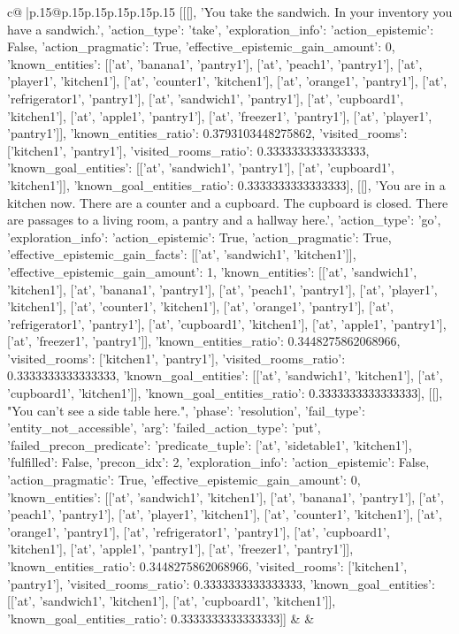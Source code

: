 \documentclass{article}
\begin{document}
{\begin{supertabular}{c@{$\;$}|p{.15\linewidth}@{}p{.15\linewidth}p{.15\linewidth}p{.15\linewidth}p{.15\linewidth}p{.15\linewidth}}
{{{	 [[[], 'You take the sandwich. In your inventory you have a sandwich.', {'action_type': 'take', 'exploration_info': {'action_epistemic': False, 'action_pragmatic': True, 'effective_epistemic_gain_amount': 0, 'known_entities': [['at', 'banana1', 'pantry1'], ['at', 'peach1', 'pantry1'], ['at', 'player1', 'kitchen1'], ['at', 'counter1', 'kitchen1'], ['at', 'orange1', 'pantry1'], ['at', 'refrigerator1', 'pantry1'], ['at', 'sandwich1', 'pantry1'], ['at', 'cupboard1', 'kitchen1'], ['at', 'apple1', 'pantry1'], ['at', 'freezer1', 'pantry1'], ['at', 'player1', 'pantry1']], 'known_entities_ratio': 0.3793103448275862, 'visited_rooms': ['kitchen1', 'pantry1'], 'visited_rooms_ratio': 0.3333333333333333, 'known_goal_entities': [['at', 'sandwich1', 'pantry1'], ['at', 'cupboard1', 'kitchen1']], 'known_goal_entities_ratio': 0.3333333333333333}}], [[], 'You are in a kitchen now. There are a counter and a cupboard. The cupboard is closed. There are passages to a living room, a pantry and a hallway here.', {'action_type': 'go', 'exploration_info': {'action_epistemic': True, 'action_pragmatic': True, 'effective_epistemic_gain_facts': [['at', 'sandwich1', 'kitchen1']], 'effective_epistemic_gain_amount': 1, 'known_entities': [['at', 'sandwich1', 'kitchen1'], ['at', 'banana1', 'pantry1'], ['at', 'peach1', 'pantry1'], ['at', 'player1', 'kitchen1'], ['at', 'counter1', 'kitchen1'], ['at', 'orange1', 'pantry1'], ['at', 'refrigerator1', 'pantry1'], ['at', 'cupboard1', 'kitchen1'], ['at', 'apple1', 'pantry1'], ['at', 'freezer1', 'pantry1']], 'known_entities_ratio': 0.3448275862068966, 'visited_rooms': ['kitchen1', 'pantry1'], 'visited_rooms_ratio': 0.3333333333333333, 'known_goal_entities': [['at', 'sandwich1', 'kitchen1'], ['at', 'cupboard1', 'kitchen1']], 'known_goal_entities_ratio': 0.3333333333333333}}], [[], "You can't see a side table here.", {'phase': 'resolution', 'fail_type': 'entity_not_accessible', 'arg': {'failed_action_type': 'put', 'failed_precon_predicate': {'predicate_tuple': ['at', 'sidetable1', 'kitchen1'], 'fulfilled': False, 'precon_idx': 2}}, 'exploration_info': {'action_epistemic': False, 'action_pragmatic': True, 'effective_epistemic_gain_amount': 0, 'known_entities': [['at', 'sandwich1', 'kitchen1'], ['at', 'banana1', 'pantry1'], ['at', 'peach1', 'pantry1'], ['at', 'player1', 'kitchen1'], ['at', 'counter1', 'kitchen1'], ['at', 'orange1', 'pantry1'], ['at', 'refrigerator1', 'pantry1'], ['at', 'cupboard1', 'kitchen1'], ['at', 'apple1', 'pantry1'], ['at', 'freezer1', 'pantry1']], 'known_entities_ratio': 0.3448275862068966, 'visited_rooms': ['kitchen1', 'pantry1'], 'visited_rooms_ratio': 0.3333333333333333, 'known_goal_entities': [['at', 'sandwich1', 'kitchen1'], ['at', 'cupboard1', 'kitchen1']], 'known_goal_entities_ratio': 0.3333333333333333}}]] 
	  } 
	   } 
	   } 
	 & & \\ 
 


\end{supertabular}}
\end{document}
